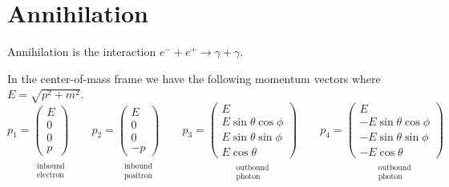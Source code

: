 

\section*{Annihilation}
Annihilation is the interaction $e^-+e^+\rightarrow\gamma+\gamma$.

\begin{center}
\end{center}

In the center-of-mass frame we have the following momentum vectors where $E=\sqrt{p^2+m^2}$.
\begin{equation*}
p_1=\underset{\substack{\\ \text{inbound}\\ \text{electron}}}
{\begin{pmatrix}E\\0\\0\\p\end{pmatrix}}
\qquad
p_2=\underset{\substack{\\ \text{inbound}\\ \text{positron}}}
{\begin{pmatrix}E\\0\\0\\-p\end{pmatrix}}
\qquad
p_3=\underset{\substack{\\ \text{outbound}\\ \text{photon}}}
{\begin{pmatrix}E\\ E\sin\theta\cos\phi\\ E\sin\theta\sin\phi\\ E\cos\theta\end{pmatrix}}
\qquad
p_4=\underset{\substack{\\ \text{outbound}\\ \text{photon}}}
{\begin{pmatrix}E\\ -E\sin\theta\cos\phi\\ -E\sin\theta\sin\phi\\ -E\cos\theta\end{pmatrix}}
\end{equation*}

